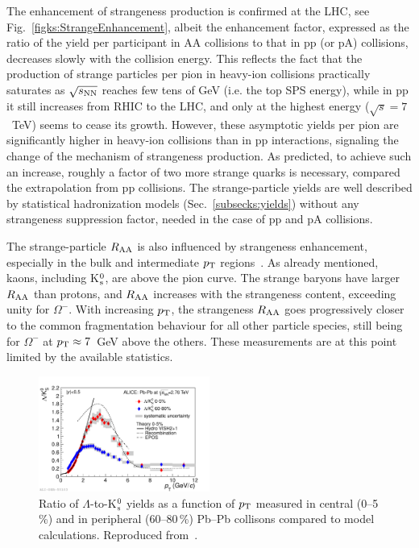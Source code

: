 The enhancement of strangeness production is confirmed at the LHC, see Fig.~\ref{figks:StrangeEnhancement}, albeit the enhancement factor, expressed as the ratio of the yield per participant in AA collisions to that in pp (or pA) collisions, decreases slowly with the collision energy. This reflects the fact that the production of strange particles per pion in heavy-ion collisions practically saturates as $\sqrt{s_{\rm NN}}$ reaches few tens of GeV (i.e. the top SPS energy), while in pp it still increases from RHIC to the LHC, and only at the highest energy ($\sqrt{s} = 7$~TeV) seems to cease its growth. However, these asymptotic yields per pion are significantly higher in heavy-ion collisions than in pp interactions, signaling the change of the mechanism of strangeness production. As predicted, to achieve such an increase, roughly a factor of two more strange quarks is necessary, compared the extrapolation from pp collisions. The strange-particle yields are well described by statistical hadronization models (Sec.~\ref{subsecks:yields}) without any strangeness suppression factor, needed in the case of pp and pA collisions.

The strange-particle $R_{\rm AA}$ is also influenced by strangeness enhancement, especially in the bulk and intermediate $p_{\rm T}$ regions~\cite{Knospe:2013tda}. As already mentioned, kaons, including K$_{\rm s}^0$, are above the pion curve. The strange baryons have larger $R_{\rm AA}$ than protons, and $R_{\rm AA}$ increases with the strangeness content, exceeding unity for $\Omega^-$. With increasing $p_{\rm T}$, the strangeness $R_{\rm AA}$ goes progressively closer to the common fragmentation behaviour for all other particle species, still being for $\Omega^-$ at $p_{\rm T} \approx 7$~GeV above the others. These measurements are at this point limited by the available statistics.

\begin{figure}
\centering
\includegraphics[width=0.5\textwidth]{ksfigures/LambdaToK0T.pdf}
\caption{Ratio of $\Lambda$-to-K$_{\rm s}^0$ yields as a function of $p_{\rm T}$ measured in central (0--5\,\%) and in peripheral (60--80\,\%) Pb--Pb collisons compared to model calculations. Reproduced from~\cite{Abelev:2013xaa}.}
\label{figks:LambdaToK}
\end{figure}


